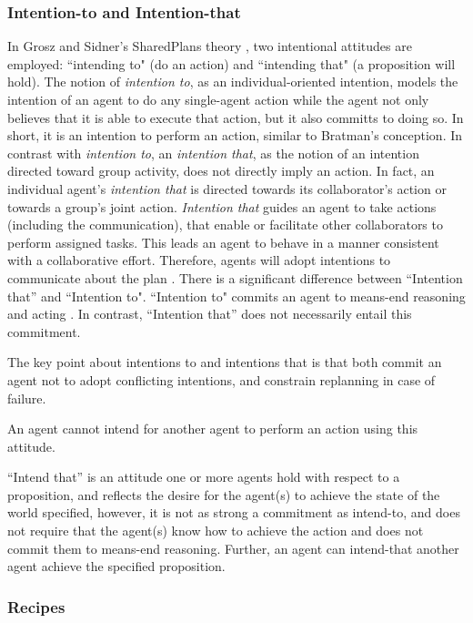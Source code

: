\documentclass[11pt]{article}
\begin{document}
\subsubsection{Intention-to and Intention-that}

In Grosz and Sidner's SharedPlans theory \cite{grosz:plans-discourse}, two
intentional attitudes are employed: ``intending to" (do an action) and
``intending that" (a proposition will hold). The notion of \textit{intention
to}, as an individual-oriented intention, models the intention of an agent to do
any single-agent action while the agent not only believes that it is able to
execute that action, but it also committs to doing so. In short, it is an
intention to perform an action, similar to Bratman’s conception. In contrast
with \textit{intention to}, an \textit{intention that}, as the notion of an
intention directed toward group activity, does not directly imply an action. In
fact, an individual agent's \textit{intention that} is directed towards its
collaborator's action or towards a group's joint action. \textit{Intention that}
guides an agent to take actions (including the communication), that enable or
facilitate other collaborators to perform assigned tasks. This leads an agent to
behave in a manner consistent with a collaborative effort. Therefore, agents
will adopt intentions to communicate about the plan \cite{grosz:collaboration}.
There is a significant difference between ``Intention that'' and ``Intention
to". ``Intention to" commits an agent to means-end reasoning and acting
\cite{bratman:intentions-plans}. In contrast, ``Intention that'' does not
necessarily entail this commitment.

The key point about intentions to and intentions that is that both commit an
agent not to adopt conflicting intentions, and constrain replanning in case of
failure.

An agent cannot intend for another agent to perform an action using this
attitude.

``Intend that'' is an attitude one or more agents hold with respect to a
proposition, and reflects the desire for the agent(s) to achieve the state of
the world specified, however, it is not as strong a commitment as intend-to, and
does not require that the agent(s) know how to achieve the action and does not
commit them to means-end reasoning. Further, an agent can intend-that another
agent achieve the specified proposition.

\subsubsection{Recipes}
\end{document}
